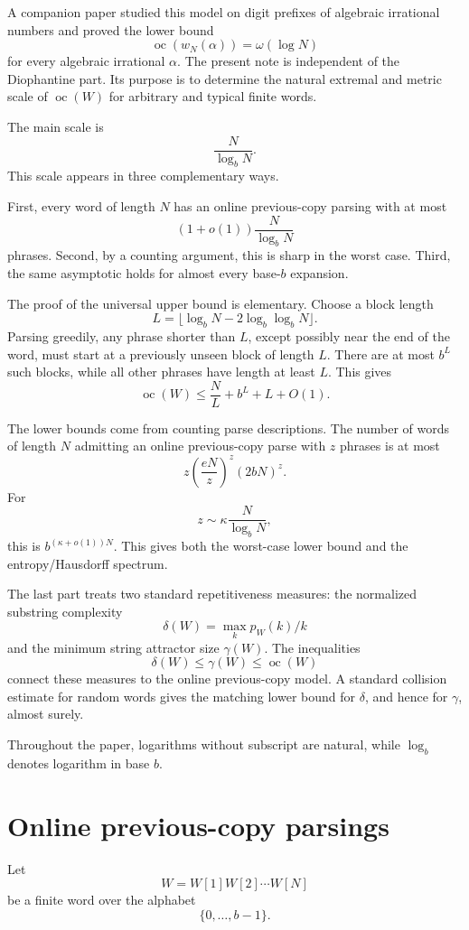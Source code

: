 \documentclass[11pt]{amsart}
\DeclareMathOperator{\oc}{oc}
\begin{document}
A companion paper studied this model on digit prefixes of algebraic irrational numbers and proved the lower bound
\[
\oc(w_N(\alpha))=\omega(\log N)
\]
for every algebraic irrational $\alpha$. The present note is independent of the Diophantine part. Its purpose is to determine the natural extremal and metric scale of $\oc(W)$ for arbitrary and typical finite words.

The main scale is
\[
\frac{N}{\log_b N}.
\]
This scale appears in three complementary ways.

First, every word of length $N$ has an online previous-copy parsing with at most
\[
(1+o(1))\frac{N}{\log_b N}
\]
phrases. Second, by a counting argument, this is sharp in the worst case. Third, the same asymptotic holds for almost every base-$b$ expansion.

The proof of the universal upper bound is elementary. Choose a block length
\[
L=\lfloor \log_b N-2\log_b\log_b N\rfloor.
\]
Parsing greedily, any phrase shorter than $L$, except possibly near the end of the word, must start at a previously unseen block of length $L$. There are at most $b^L$ such blocks, while all other phrases have length at least $L$. This gives
\[
\oc(W)\leq \frac{N}{L}+b^L+L+O(1).
\]

The lower bounds come from counting parse descriptions. The number of words of length $N$ admitting an online previous-copy parse with $z$ phrases is at most
\[
z\left(\frac{eN}{z}\right)^z(2bN)^z.
\]
For
\[
z\sim \kappa \frac{N}{\log_b N},
\]
this is $b^{(\kappa+o(1))N}$. This gives both the worst-case lower bound and the entropy/Hausdorff spectrum.

The last part treats two standard repetitiveness measures: the normalized substring complexity
\[
\delta(W)=\max_k p_W(k)/k
\]
and the minimum string attractor size $\gamma(W)$. The inequalities
\[
\delta(W)\leq\gamma(W)\leq\oc(W)
\]
connect these measures to the online previous-copy model. A standard collision estimate for random words gives the matching lower bound for $\delta$, and hence for $\gamma$, almost surely.

Throughout the paper, logarithms without subscript are natural, while $\log_b$ denotes logarithm in base $b$.

\section{Online previous-copy parsings}

Let
\[
W=W[1]W[2]\cdots W[N]
\]
be a finite word over the alphabet
\[
\{0,\ldots,b-1\}.
\]
\end{document}
